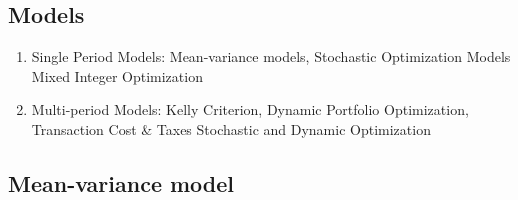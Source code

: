 \documentclass[11pt, openany]{book}              %
\begin{document}
\subsection{Models}

\begin{enumerate}
	\item Single Period Models: Mean-variance models, Stochastic Optimization Models
		\subitem  Mixed Integer Optimization
	\item Multi-period Models: Kelly Criterion, Dynamic Portfolio Optimization, Transaction Cost \& Taxes
		\subitem  Stochastic and Dynamic Optimization
\end{enumerate}

\subsection{Mean-variance model}
\end{document}
